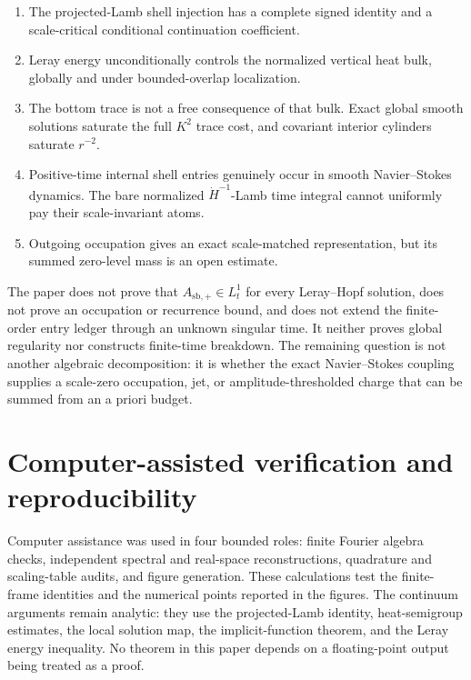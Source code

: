 \documentclass[11pt]{article}
\theoremstyle{definition}
\begin{document}
\begin{enumerate}
\item The projected-Lamb shell injection has a complete signed identity and
      a scale-critical conditional continuation coefficient.
\item Leray energy unconditionally controls the normalized vertical heat
      bulk, globally and under bounded-overlap localization.
\item The bottom trace is not a free consequence of that bulk.  Exact global
      smooth solutions saturate the full \(K^2\) trace cost, and covariant
      interior cylinders saturate \(r^{-2}\).
\item Positive-time internal shell entries genuinely occur in smooth
      Navier--Stokes dynamics.  The bare normalized \(\dot H^{-1}\)-Lamb
      time integral cannot uniformly pay their scale-invariant atoms.
\item Outgoing occupation gives an exact scale-matched representation, but
      its summed zero-level mass is an open estimate.
\end{enumerate}

The paper does not prove that \(A_{\mathrm{sb},+}\in L^1_t\) for every
Leray--Hopf solution, does not prove an occupation or recurrence bound, and
does not extend the finite-order entry ledger through an unknown singular
time.  It neither proves global regularity nor constructs finite-time
breakdown.  The remaining question is not another algebraic decomposition:
it is whether the exact Navier--Stokes coupling supplies a scale-zero
occupation, jet, or amplitude-thresholded charge that can be summed from an
a priori budget.

\section*{Computer-assisted verification and reproducibility}

Computer assistance was used in four bounded roles: finite Fourier algebra
checks, independent spectral and real-space reconstructions, quadrature and
scaling-table audits, and figure generation.  These calculations test the
finite-frame identities and the numerical points reported in the figures.
The continuum arguments remain analytic: they use the projected-Lamb identity,
heat-semigroup estimates, the local solution map, the implicit-function
theorem, and the Leray energy inequality.  No theorem in this paper depends on
a floating-point output being treated as a proof.
\end{document}
